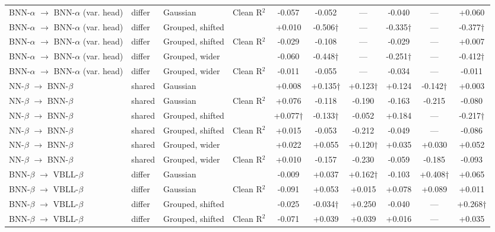 \begin{landscape}
{\begin{longtable}{llllcccccc}
BNN-$\alpha$ $\rightarrow$ BNN-$\alpha$ (var. head) & differ & Gaussian & Clean R$^2$ & -0.057 & -0.052 & --- & -0.040 & --- & +0.060 \\
BNN-$\alpha$ $\rightarrow$ BNN-$\alpha$ (var. head) & differ & Grouped, shifted & \aucnorm{} & +0.010 & -0.506† & --- & -0.335† & --- & -0.377† \\
BNN-$\alpha$ $\rightarrow$ BNN-$\alpha$ (var. head) & differ & Grouped, shifted & Clean R$^2$ & -0.029 & -0.108 & --- & -0.029 & --- & +0.007 \\
BNN-$\alpha$ $\rightarrow$ BNN-$\alpha$ (var. head) & differ & Grouped, wider & \aucnorm{} & -0.060 & -0.448† & --- & -0.251† & --- & -0.412† \\
BNN-$\alpha$ $\rightarrow$ BNN-$\alpha$ (var. head) & differ & Grouped, wider & Clean R$^2$ & -0.011 & -0.055 & --- & -0.034 & --- & -0.011 \\
NN-$\beta$ $\rightarrow$ BNN-$\beta$ & shared & Gaussian & \aucnorm{} & +0.008 & +0.135† & +0.123† & +0.124 & -0.142† & +0.003 \\
NN-$\beta$ $\rightarrow$ BNN-$\beta$ & shared & Gaussian & Clean R$^2$ & +0.076 & -0.118 & -0.190 & -0.163 & -0.215 & -0.080 \\
NN-$\beta$ $\rightarrow$ BNN-$\beta$ & shared & Grouped, shifted & \aucnorm{} & +0.077† & -0.133† & -0.052 & +0.184 & --- & -0.217† \\
NN-$\beta$ $\rightarrow$ BNN-$\beta$ & shared & Grouped, shifted & Clean R$^2$ & +0.015 & -0.053 & -0.212 & -0.049 & --- & -0.086 \\
NN-$\beta$ $\rightarrow$ BNN-$\beta$ & shared & Grouped, wider & \aucnorm{} & +0.022 & +0.055 & +0.120† & +0.035 & +0.030 & +0.052 \\
NN-$\beta$ $\rightarrow$ BNN-$\beta$ & shared & Grouped, wider & Clean R$^2$ & +0.010 & -0.157 & -0.230 & -0.059 & -0.185 & -0.093 \\
BNN-$\beta$ $\rightarrow$ VBLL-$\beta$ & differ & Gaussian & \aucnorm{} & -0.009 & +0.037 & +0.162† & -0.103 & +0.408† & +0.065 \\
BNN-$\beta$ $\rightarrow$ VBLL-$\beta$ & differ & Gaussian & Clean R$^2$ & -0.091 & +0.053 & +0.015 & +0.078 & +0.089 & +0.011 \\
BNN-$\beta$ $\rightarrow$ VBLL-$\beta$ & differ & Grouped, shifted & \aucnorm{} & -0.025 & -0.034† & +0.250 & -0.040 & --- & +0.268† \\
BNN-$\beta$ $\rightarrow$ VBLL-$\beta$ & differ & Grouped, shifted & Clean R$^2$ & -0.071 & +0.039 & +0.039 & +0.016 & --- & +0.035 \\

\end{longtable}}
\end{landscape}
